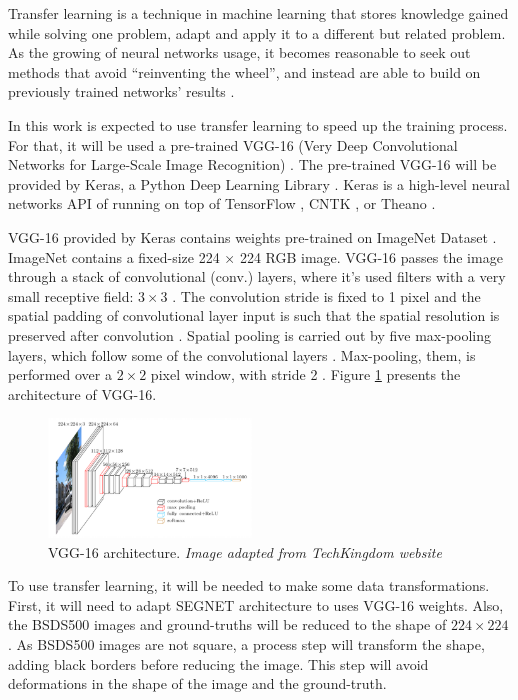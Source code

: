\documentclass[10pt,twocolumn,letterpaper]{article}
\begin{document}
Transfer learning is a technique in machine learning that stores knowledge gained while solving one problem, adapt and apply it to a different but related problem. As the growing of neural networks usage, it becomes reasonable to seek out methods that avoid ``reinventing the wheel'', and instead are able to build on previously trained networks' results \cite{PRATT} \cite{WEISS2016}.

In this work is expected to use transfer learning to speed up the training process. For that, it will be used a pre-trained VGG-16 (Very Deep Convolutional Networks for Large-Scale Image Recognition) \cite{VGGNET}. The pre-trained VGG-16 will be provided by Keras, a Python Deep Learning Library \cite{KERAS}. Keras is a high-level neural networks API of running on top of TensorFlow \cite{TENSORFLOW}, CNTK \cite{CNTK}, or Theano \cite{THEANO} \cite{KERAS}.

VGG-16 provided by Keras contains weights pre-trained on ImageNet Dataset \cite{IMAGENET}. ImageNet contains a fixed-size 224 × 224 RGB image. VGG-16 passes the image through a stack of convolutional (conv.) layers, where it's used filters with a very small receptive field: $3 \times 3$ \cite{VGGNET}. The convolution stride is fixed to 1 pixel and the spatial padding of convolutional layer input is such that the spatial resolution is preserved after convolution \cite{VGGNET}. Spatial pooling is carried out by five max-pooling layers, which follow some of the convolutional layers \cite{VGGNET}. Max-pooling, them, is performed over a $2 \times 2$ pixel window, with stride 2 \cite{VGGNET}. Figure \ref{fig:vgg16} presents the architecture of VGG-16.

\begin{figure}[ht]
  \centering
  \includegraphics[width=0.48\textwidth]{vgg16.png}
  \caption{VGG-16 architecture. \textit{Image adapted from TechKingdom website\cite{VGG16_IMG}}}
  \label{fig:vgg16}
\end{figure}

To use transfer learning, it will be needed to make some data transformations. First, it will need to adapt SEGNET architecture to uses VGG-16 weights. Also, the BSDS500 images and ground-truths will be reduced to the shape of $ 224 \times 224$. As BSDS500 images are not square, a process step will transform the shape, adding black borders before reducing the image. This step will avoid deformations in the shape of the image and the ground-truth.
\end{document}
